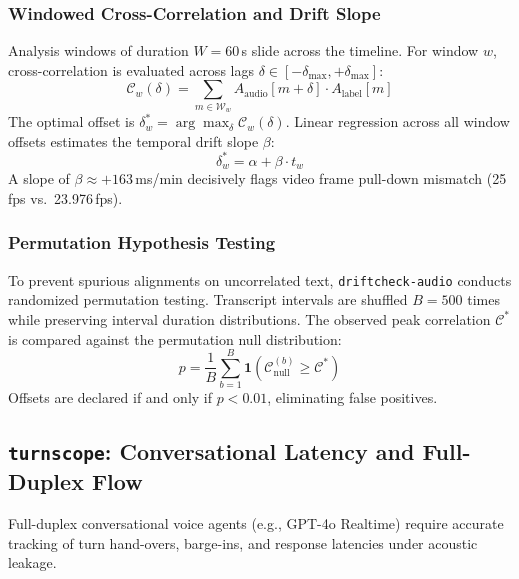 \documentclass[10pt,journal,compsoc]{IEEEtran}
\begin{document}
\subsubsection{Windowed Cross-Correlation and Drift Slope}
Analysis windows of duration $W = 60$\,s slide across the timeline. For window $w$, cross-correlation is evaluated across lags $\delta \in [-\delta_{\max}, +\delta_{\max}]$:
\begin{equation}
\mathcal{C}_w(\delta) = \sum_{m \in \mathcal{W}_w} A_{\text{audio}}[m + \delta] \cdot A_{\text{label}}[m]
\label{eq:drift_xcorr}
\end{equation}
The optimal offset is $\delta_w^* = \arg\max_\delta \mathcal{C}_w(\delta)$. Linear regression across all window offsets estimates the temporal drift slope $\beta$:
\begin{equation}
\delta_w^* = \alpha + \beta \cdot t_w
\label{eq:drift_reg}
\end{equation}
A slope of $\beta \approx +163$\,ms/min decisively flags video frame pull-down mismatch (25\,fps vs.\ 23.976\,fps).

\subsubsection{Permutation Hypothesis Testing}
To prevent spurious alignments on uncorrelated text, \texttt{driftcheck-audio} conducts randomized permutation testing. Transcript intervals are shuffled $B = 500$ times while preserving interval duration distributions. The observed peak correlation $\mathcal{C}^*$ is compared against the permutation null distribution:
\begin{equation}
p = \frac{1}{B} \sum_{b=1}^B \mathbf{1}(\mathcal{C}_{\text{null}}^{(b)} \ge \mathcal{C}^*)
\label{eq:perm_p}
\end{equation}
Offsets are declared if and only if $p < 0.01$, eliminating false positives.

\subsection{\texttt{turnscope}: Conversational Latency and Full-Duplex Flow}
Full-duplex conversational voice agents (e.g., GPT-4o Realtime) require accurate tracking of turn hand-overs, barge-ins, and response latencies under acoustic leakage.
\end{document}
